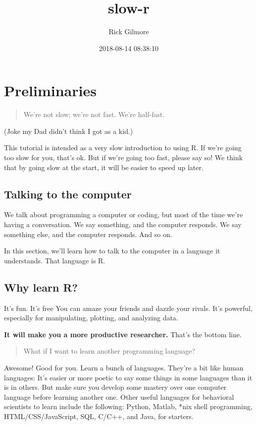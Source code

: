 \documentclass[]{article}
\title{slow-r}
\author{Rick Gilmore}
\date{2018-08-14 08:38:10}
\begin{document}
\maketitle

\section{Preliminaries}\label{preliminaries}

\begin{quote}
We're not slow; we're not fast. We're half-fast.
\end{quote}

(Joke my Dad didn't think I got as a kid.)

This tutorial is intended as a very slow introduction to using R. If
we're going too slow for you, that's ok. But if we're going too fast,
please say so! We think that by going slow at the start, it will be
easier to speed up later.

\subsection{Talking to the computer}\label{talking-to-the-computer}

We talk about programming a computer or coding, but most of the time
we're having a conversation. We say something, and the computer
responds. We say something else, and the computer responds. And so on.

In this section, we'll learn how to talk to the computer in a language
it understands. That language is R.

\subsection{Why learn R?}\label{why-learn-r}

It's fun. It's free You can amaze your friends and dazzle your rivals.
It's powerful, especially for manipulating, plotting, and analyzing
data.

\textbf{It will make you a more productive researcher.} That's the
bottom line.

\begin{quote}
What if I want to learn another programming language?
\end{quote}

Awesome! Good for you. Learn a bunch of languages. They're a bit like
human languages: It's easier or more poetic to say some things in some
languages than it is in others. But make sure you develop some mastery
over one computer language before learning another one. Other useful
languages for behavioral scientists to learn include the following:
Python, Matlab, *nix shell programming, HTML/CSS/JavaScript, SQL, C/C++,
and Java, for starters.
\end{document}
